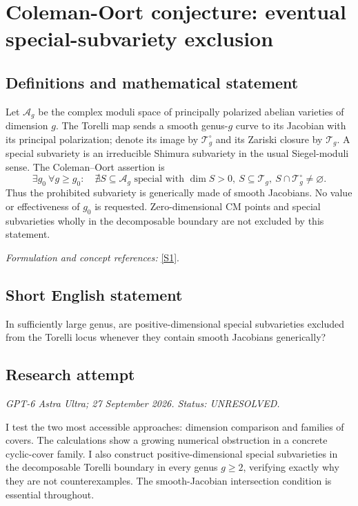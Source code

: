 \documentclass[11pt]{article}
\begin{document}
\section*{\texorpdfstring{Coleman-Oort conjecture: eventual special-subvariety exclusion}{Coleman-Oort conjecture: eventual special-subvariety exclusion}}\label{statement}
\subsection{Definitions and mathematical statement}
Let $\mathcal A_g$ be the complex moduli space of principally polarized abelian varieties of dimension $g$. The Torelli map sends a smooth genus-$g$ curve to its Jacobian with its principal polarization; denote its image by $\mathcal T_g^\circ$ and its Zariski closure by $\mathcal T_g$. A special subvariety is an irreducible Shimura subvariety in the usual Siegel-moduli sense. The Coleman--Oort assertion is
\[
 \exists g_0\ \forall g\ge g_0:\quad
 \nexists S\subseteq\mathcal A_g\text{ special with }
 \dim S>0,\ S\subseteq\mathcal T_g,\ S\cap\mathcal T_g^\circ\ne\varnothing.
\]
Thus the prohibited subvariety is generically made of smooth Jacobians. No value or effectiveness of $g_0$ is requested. Zero-dimensional CM points and special subvarieties wholly in the decomposable boundary are not excluded by this statement.
\par\smallskip\textit{Formulation and concept references:} \href{https://arxiv.org/pdf/2102.12349v2}{[S1]}.

\subsection{Short English statement}
In sufficiently large genus, are positive-dimensional special subvarieties excluded from the Torelli locus whenever they contain smooth Jacobians generically?
\subsection{Research attempt}
\textit{GPT-6 Astra Ultra; 27 September 2026. Status: UNRESOLVED.}

I test the two most accessible approaches: dimension comparison and
families of covers. The calculations show a growing numerical
obstruction in a concrete cyclic-cover family. I also construct
positive-dimensional special subvarieties in the decomposable Torelli
boundary in every genus $g\ge2$, verifying exactly why they are not
counterexamples. The smooth-Jacobian intersection condition is essential
throughout.
\end{document}
